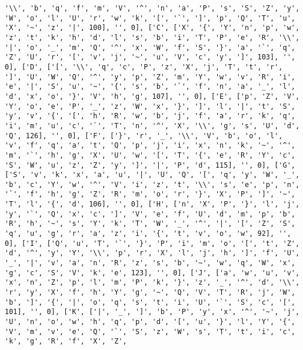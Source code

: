 \documentclass{article}
\begin{document}
\begin{verbatim}
'\\', 'b', 'q', 'f', 'm', 'V', '^', 'n', 'a', 'P', 's', 'S', 'Z', 'y', 'W', 'o', 'l', 'U', 'r', 'w', 'k', '[', '`', ']', 'p', 'Q', 'T', 'u', 'X', '~', 'z', '|', 100], '', 0], ['C', ['X', '{', 'Y', 'n', 'p', 'w', 'z', 't', 'k', 'h', 'd', 'l', 's', 'b', 'i', 'T', 'P', 'e', 'R', '\\', '|', 'o', '_', 'm', 'Q', '^', 'x', 'W', 'f', 'S', '}', 'a', '`', 'q', 'Z', 'U', 'r', '[', 'v', 'j', '~', 'u', 'V', 'c', 'y', ']', 103], '', 0], ['D', ['[', '\\', 'q', 'c', 'P', 'z', 'X', 'j', 'T', 't', 'r', ']', 'U', 'W', 'Q', '^', 'y', 'p', 'Z', 'm', 'Y', 'w', 'v', 'R', 'i', 'e', '|', 'S', 'u', '~', '{', 's', 'b', '`', 'f', 'n', 'a', '_', 'l', 'd', 'x', 'o', '}', 'V', 'h', 'g', 107], '', 0], ['E', ['p', 'Z', 'V', 'Y', 'o', 'e', 'P', '_', 'z', 'W', 'x', '}', ']', 'l', '|', 't', 'S', 'y', 'v', '{', '[', 'h', 'R', 'w', 'b', 'j', 'f', 'a', 'r', 'k', 'q', 'i', 'm', 'u', 'c', '`', 'T', 'n', '^', 'X', '\\', 'g', 's', 'U', 'd', 'Q', 126], '', 0], ['F', ['}', 'r', '_', '\\', 'V', 'b', 'o', 'l', 'v', 'f', 'q', 'a', 't', 'Q', 'p', 'j', 'i', 'x', 'n', 'k', '~', '^', 'm', '`', 'h', 'g', 'X', 'U', 'w', '[', 'T', '{', 'e', 'R', 'Y', 'c', 'S', 'W', 'u', 'z', 'Z', 'y', ']', '|', 'P', 'd', 115], '', 0], ['G', ['S', 'v', 'k', 'x', 'a', 'u', '|', 'U', 'Q', '[', 'q', 'y', 'W', '_', 'b', 'c', 'Y', 'w', '^', 'V', 'i', 'z', 't', '\\', 's', 'e', 'p', 'n', '`', 'f', 'h', 'g', 'Z', 'R', 'm', 'o', 'r', '}', 'X', 'P', ']', '~', 'T', 'l', '{', 'd', 106], '', 0], ['H', ['n', 'X', 'P', '}', 'l', 'j', 'y', '`', 'Q', 'x', 'c', ']', 'V', 'e', 'f', 'U', 'd', 'm', 'p', 'b', 'R', 'h', '~', 's', 'Y', 'k', 'T', 'W', '_', '^', '|', '[', 'Z', 'S', 'q', 'u', 'g', 'r', 'a', 'z', 'i', '{', 't', 'v', 'o', 'w', 92], '', 0], ['I', ['Q', 'u', 'T', '`', '}', 'P', 'i', 'm', 'o', '[', 't', 'Z', 'd', '^', 'y', 'Y', '\\', 'p', 'r', 'X', 'l', 'j', 'h', ']', 'f', 'U', '_', '|', 'v', 'a', 'n', 'R', 'z', 's', 'b', '~', 'w', 'q', 'W', 'x', 'g', 'c', 'S', 'V', 'k', 'e', 123], '', 0], ['J', ['a', 'w', 'u', 'v', 'x', 'n', 'Z', 'p', 'l', 'm', 'P', 'k', '}', 'z', '_', '^', 'd', '\\', 'r', 'y', 'X', 'f', 'h', 'Y', 'g', '~', 'Q', 'V', 'T', 'R', 'j', 'W', 'b', ']', '{', '|', 'o', 'q', 's', 't', 'i', 'U', '`', 'S', 'c', '[', 101], '', 0], ['K', ['|', '_', ']', 'b', 'P', 'y', 'x', '^', '~', 'j', 'U', 'n', 'o', 'w', 'h', 'q', 'p', 'd', '[', 'u', '}', 'l', 'Y', '{', 'V', 'm', 'v', 'e', 'Q', '`', 'S', 'z', 'W', 's', 'T', 't', 'i', 'c', 'k', 'g', 'R', 'f', 'X', 'Z', 

\end{verbatim}
\end{document}
